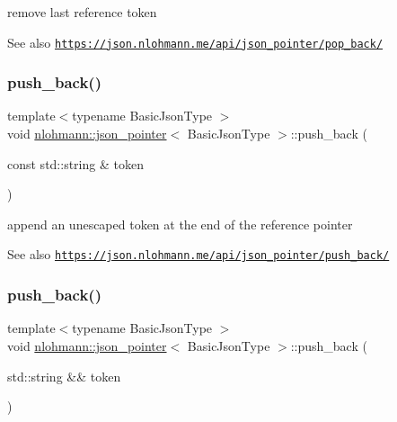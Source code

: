 remove last reference token 

\begin{DoxySeeAlso}{See also}
\href{https://json.nlohmann.me/api/json_pointer/pop_back/}{\tt https\+://json.\+nlohmann.\+me/api/json\+\_\+pointer/pop\+\_\+back/} 
\end{DoxySeeAlso}
\mbox{\label{classnlohmann_1_1json__pointer_a697d12b5bd6205f8866691b166b7c7dc}} 
\subsubsection{\texorpdfstring{push\+\_\+back()}{push\_back()}\hspace{0.1cm}{\footnotesize\ttfamily [1/2]}}
{\footnotesize\ttfamily template$<$typename Basic\+Json\+Type $>$ \\
void \hyperlink{classnlohmann_1_1json__pointer}{nlohmann\+::json\+\_\+pointer}$<$ Basic\+Json\+Type $>$\+::push\+\_\+back (\begin{DoxyParamCaption}\item[{const std\+::string \&}]{token }\end{DoxyParamCaption})\hspace{0.3cm}{\ttfamily [inline]}}



append an unescaped token at the end of the reference pointer 

\begin{DoxySeeAlso}{See also}
\href{https://json.nlohmann.me/api/json_pointer/push_back/}{\tt https\+://json.\+nlohmann.\+me/api/json\+\_\+pointer/push\+\_\+back/} 
\end{DoxySeeAlso}
\mbox{\label{classnlohmann_1_1json__pointer_ac228b13596d3c34185da9fe61b570194}} 
\subsubsection{\texorpdfstring{push\+\_\+back()}{push\_back()}\hspace{0.1cm}{\footnotesize\ttfamily [2/2]}}
{\footnotesize\ttfamily template$<$typename Basic\+Json\+Type $>$ \\
void \hyperlink{classnlohmann_1_1json__pointer}{nlohmann\+::json\+\_\+pointer}$<$ Basic\+Json\+Type $>$\+::push\+\_\+back (\begin{DoxyParamCaption}\item[{std\+::string \&\&}]{token }\end{DoxyParamCaption})\hspace{0.3cm}{\ttfamily [inline]}}



